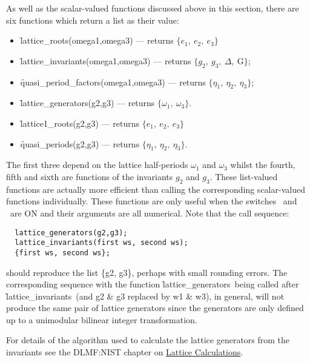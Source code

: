 As well as the scalar-valued functions discussed above in this section,
there are six functions which return a list as their value:
\hypertarget{operator:LATTICE_ROOTS}{}
\hypertarget{operator:LATTICE_INVARIANTS}{}
\hypertarget{operator:LATTICE_GENERATORS}{}
\hypertarget{operator:QUASI_PERIOD_FACTORS}{}
\begin{itemize}
\item \f{lattice\_roots(omega1,omega3)} --- returns $\{e_1,\ e_2,\ e_3\}$
\item \f{lattice\_invariants(omega1,omega3)} --- returns
  $\{g_2,\ g_3,\ \Delta,\ \mathrm{G}\}$;
\item \f{quasi\_period\_factors(omega1,omega3)}
  --- returns $\{\eta_1,\ \eta_2,\ \eta_3\}$;
\item \f{lattice\_generators(g2,g3)}  --- returns $\{\omega_1,\ \omega_3\}$.
\item \f{lattice1\_roots(g2,g3)}  --- returns $\{e_1,\ e_2,\ e_3\}$
\item \f{quasi\_periods(g2,g3)}  --- returns $\{\eta_1,\ \eta_2,\ \eta_3\}$.
\end{itemize}
The first three depend on the lattice half-periods $\omega_1$ and $\omega_3$ whilst
the fourth, fifth and sixth are functions of the invariants $g_2$ and $g_3$. These
list-valued functions are actually more efficient than calling the corresponding
scalar-valued functions individually.
These functions are only useful when the switches \ and
\ are ON and their arguments are all numerical.
Note that the call sequence:
\begin{verbatim}
  lattice_generators(g2,g3);
  lattice_invariants(first ws, second ws);
  {first ws, second ws};
\end{verbatim}
should reproduce the list \{g2, g3\}, perhaps with small rounding errors. The
corresponding sequence with the function \f{lattice\_generators}\ being called
after \f{lattice\_invariants}\ (and g2 \& g3 replaced by w1 \& w3),
in general, will not produce the same pair of lattice generators since the
generators are only defined up to a unimodular bilinear integer transformation.

For details of the algorithm used to calculate the lattice generators from the
invariants see the DLMF:NIST chapter on
\href{https://dlmf.nist.gov/23.22#ii}{Lattice Calculations}.

